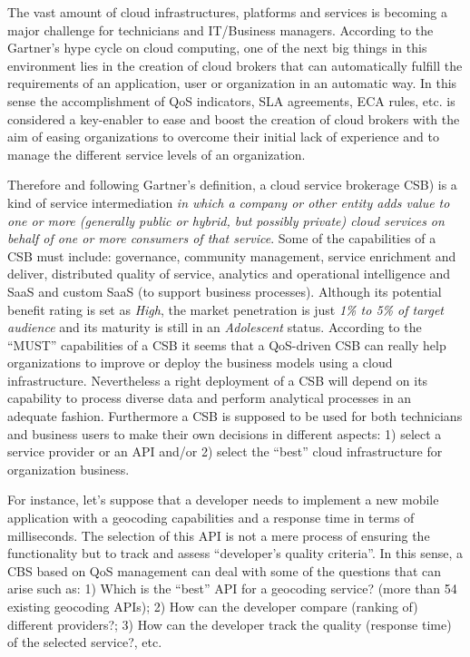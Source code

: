 The vast amount of cloud infrastructures, platforms and services is 
becoming a major challenge for technicians and IT/Business managers. According 
to the Gartner's hype cycle on cloud computing, one of the next big things in this environment lies in the creation 
of cloud brokers that can automatically fulfill the requirements of an application, user 
or organization in an automatic way. In this sense the accomplishment of QoS indicators, 
SLA agreements, ECA rules, etc. is considered a key-enabler to ease and boost the creation 
of cloud brokers with the aim of easing organizations to overcome their initial lack 
of experience and to manage the different service levels of an organization.

Therefore and following Gartner's definition, a cloud service brokerage CSB) is a kind of service intermediation 
\textit{in which a company or other entity adds value to one or more (generally public or hybrid, but possibly private) 
cloud services on behalf of one or more consumers of that service}. Some of the capabilities of a 
CSB must include: governance, community management, service enrichment and deliver, distributed quality of service, 
analytics and operational intelligence and SaaS and custom SaaS (to support business processes). 
Although its potential benefit rating is set as \textit{High}, the market penetration is just \textit{1\% to 5\% of target audience} 
and its maturity is still in an \textit{Adolescent} status. According to the ``MUST'' capabilities of a CSB it 
seems that a QoS-driven CSB can really help organizations to improve or deploy the business models 
using a cloud infrastructure. Nevertheless a right deployment of a CSB will depend on its capability 
to process diverse data and perform analytical processes in an adequate fashion. Furthermore 
a CSB is supposed to be used for both technicians and business users to make their 
own decisions in different aspects: 1) select a service provider or an API and/or 2) select 
the ``best'' cloud infrastructure for organization business.

For instance, let's suppose that a developer needs to implement a new mobile application 
with a geocoding capabilities and a response time in terms of milliseconds. The selection of this 
API is not a mere process of ensuring the functionality but to track 
and assess ``developer's quality criteria''. In this sense, a CBS based on QoS management can 
deal with some of the questions that can arise such as: 1) Which is the ``best'' API for a geocoding service? (more than 54 existing geocoding APIs);
2) How can the developer compare (ranking of) different providers?; 3) How can the developer track the quality (response time) of the selected service?, etc.

